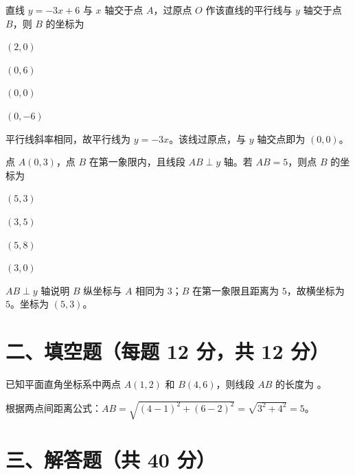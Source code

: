 \documentclass{exam-zh}
\begin{document}
\begin{question}[points=12]
  直线 $y = -3x + 6$ 与 $x$ 轴交于点 $A$，过原点 $O$ 作该直线的平行线与 $y$ 轴交于点 $B$，则 $B$ 的坐标为
  \begin{choices}
    \item $(2, 0)$
    \item $(0, 6)$
    \item $(0, 0)$
    \item $(0, -6)$
  \end{choices}
  \paren[C]
  \begin{solutionblock}
    平行线斜率相同，故平行线为 $y = -3x$。该线过原点，与 $y$ 轴交点即为 $(0,0)$。
  \end{solutionblock}
\end{question}



\begin{question}[points=12]
  点 $A(0, 3)$，点 $B$ 在第一象限内，且线段 $AB \perp y$ 轴。若 $AB = 5$，则点 $B$ 的坐标为
  \begin{choices}
    \item $(5, 3)$
    \item $(3, 5)$
    \item $(5, 8)$
    \item $(3, 0)$
  \end{choices}
  \paren[A]
  \begin{solutionblock}
    $AB \perp y$ 轴说明 $B$ 纵坐标与 $A$ 相同为 $3$；$B$ 在第一象限且距离为 $5$，故横坐标为 $5$。坐标为 $(5, 3)$。
  \end{solutionblock}
\end{question}


\section*{二、填空题（每题 12 分，共 12 分）}


\begin{question}[points=12]
  已知平面直角坐标系中两点 $A(1, 2)$ 和 $B(4, 6)$，则线段 $AB$ 的长度为 \fillin。
  \paren[5]
  \begin{solutionblock}
    根据两点间距离公式：$AB = \sqrt{(4-1)^2 + (6-2)^2} = \sqrt{3^2 + 4^2} = 5$。
  \end{solutionblock}
\end{question}


\section*{三、解答题（共 40 分）}
\end{document}

